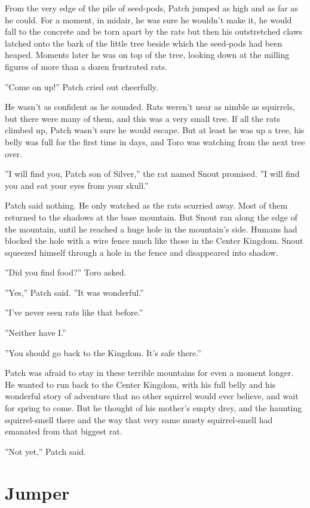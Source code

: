 \documentclass[12pt]{book}
\begin{document}
From the very edge of the pile of seed-pods, Patch jumped as high and as far as he could. For a moment, in midair, he was sure he wouldn't make it, he would fall to the concrete and be torn apart by the rats %
 but then his outstretched claws latched onto the bark of the little tree beside which the seed-pods had been heaped. Moments later he was on top of the tree, looking down at the milling figures of more than a dozen frustrated rats.\par
 ''Come on up!'' Patch cried out cheerfully.\par
 He wasn't as confident as he sounded. Rats weren't near as nimble as squirrels, but there were many of them, and this was a very small tree. If all the rats climbed up, Patch wasn't sure he would escape. But at least he was up a tree, his belly was full for the first time in days, and Toro was watching from the next tree over.\par
 ''I will find you, Patch son of Silver,'' the rat named Snout promised. ''I will find you and eat your eyes from your skull.''\par
 Patch said nothing. He only watched as the rats scurried away. Most of them returned to the shadows at the base mountain. But Snout ran along the edge of the mountain, until he reached a huge hole in the mountain's side. Humans had blocked the hole with a wire fence much like those in the Center Kingdom. Snout squeezed himself through a hole in the fence and disappeared into shadow.\par
 ''Did you find food?'' Toro asked.\par
 ''Yes,'' Patch said. ''It was wonderful.''\par
 ''I've never seen rats like that before.''\par
 ''Neither have I.''\par
 ''You should go back to the Kingdom. It's safe there.''\par
 Patch was afraid to stay in these terrible mountains for even a moment longer. He wanted to run back to the Center Kingdom, with his full belly and his wonderful story of adventure that no other squirrel would ever believe, and wait for spring to come. But he thought of his mother's empty drey, and the haunting squirrel-smell there %
 and the way that very same musty squirrel-smell had emanated from that biggest rat.\par
 ''Not yet,'' Patch said.\par

\section{Jumper}
\end{document}
